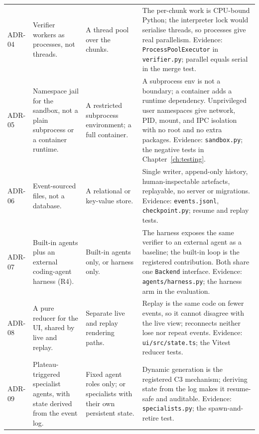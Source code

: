 \begin{longtable}{@{}p{}p{}p{}p{}@{}}
\addlinespace[2pt]
ADR-04 & Verifier workers as processes, not threads. & A thread pool over the chunks. & The per-chunk work is CPU-bound Python; the interpreter lock would serialise threads, so processes give real parallelism. Evidence: \texttt{ProcessPoolExecutor} in \texttt{verifier.py}; parallel equals serial in the merge test. \\
\addlinespace[2pt]
ADR-05 & Namespace jail for the sandbox, not a plain subprocess or a container runtime. & A restricted subprocess environment; a full container. & A subprocess env is not a boundary; a container adds a runtime dependency. Unprivileged user namespaces give network, PID, mount, and IPC isolation with no root and no extra packages. Evidence: \texttt{sandbox.py}; the negative tests in Chapter~\ref{ch:testing}. \\
\addlinespace[2pt]
ADR-06 & Event-sourced files, not a database. & A relational or key-value store. & Single writer, append-only history, human-inspectable artefacts, replayable, no server or migrations. Evidence: \texttt{events.jsonl}, \texttt{checkpoint.py}; resume and replay tests. \\
\addlinespace[2pt]
ADR-07 & Built-in agents plus an external coding-agent harness (R4). & Built-in agents only, or harness only. & The harness exposes the same verifier to an external agent as a baseline; the built-in loop is the registered contribution. Both share one \texttt{Backend} interface. Evidence: \texttt{agents/harness.py}; the harness arm in the evaluation. \\
\addlinespace[2pt]
ADR-08 & A pure reducer for the UI, shared by live and replay. & Separate live and replay rendering paths. & Replay is the same code on fewer events, so it cannot disagree with the live view; reconnects neither lose nor repeat events. Evidence: \texttt{ui/src/state.ts}; the Vitest reducer tests. \\
\addlinespace[2pt]
ADR-09 & Plateau-triggered specialist agents, with state derived from the event log. & Fixed agent roles only; or specialists with their own persistent state. & Dynamic generation is the registered C3 mechanism; deriving state from the log makes it resume-safe and auditable. Evidence: \texttt{specialists.py}; the spawn-and-retire test. \\
\bottomrule
\end{longtable}
\endgroup
